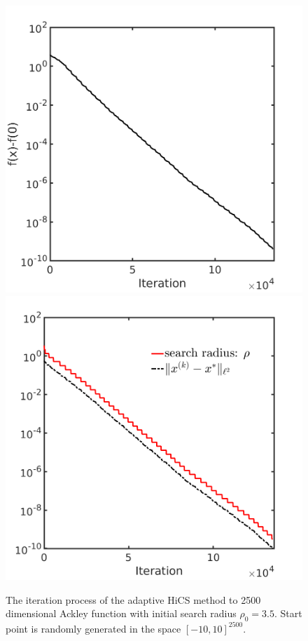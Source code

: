 \begin{figure}[!htbp] 
	\centering
	\includegraphics[scale=0.25]{../figures/ackley2500D.png}
	\includegraphics[scale=0.25]{../figures/ackley2500D_dist.png}
	  \caption{The iteration process of the adaptive HiCS method to 2500
	  dimensional Ackley function with initial search
	  radius $\rho_0=3.5$. Start point is randomly generated in the
	  space $[-10, 10]^{2500}$. } 
	\label{fig:ackley2500D:AHiCS}
\end{figure}

